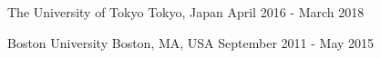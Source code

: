 %
%
%

\vspace*{0.4cm}

\begin{cventries}

    {The University of Tokyo}
    {Tokyo, Japan}
    {April 2016 - March 2018}
    {}

    {Boston University}
    {Boston, MA, USA}
    {September 2011 - May 2015}
    {}

\vspace*{-0.7cm}
\end{cventries}
